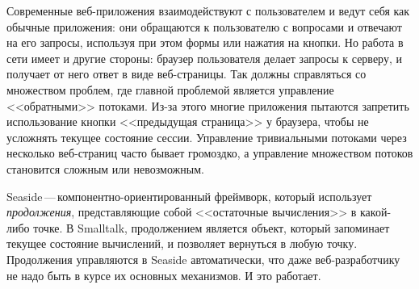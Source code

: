 \documentclass[a4paper,10pt,twoside]{book}
\begin{document}

Современные веб-приложения взаимодействуют с пользователем
и ведут себя как обычные приложения:
они обращаются к пользователю с вопросами и отвечают на его запросы,
используя при этом формы или нажатия на кнопки.
Но работа в сети имеет и другие стороны: браузер пользователя делает
запросы к серверу, и получает от него ответ в виде веб-страницы.
Так  должны справляться со множеством
проблем, где главной проблемой является управление
<<обратными>> потоками.
Из-за этого многие приложения пытаются запретить использование
кнопки <<предыдущая страница>> у браузера,
чтобы не усложнять текущее состояние сессии.
Управление тривиальными потоками через несколько веб-страниц
часто бывает громоздко,
а управление множеством потоков становится сложным или невозможным.


Seaside\,---\,компонентно-ориентированный фреймворк, который использует
\emph{продолжения}, представляющие собой <<остаточные вычисления>>
в какой-либо точке.
В Smalltalk, продолжением является объект,
который запоминает текущее состояние вычислений,
и позволяет вернуться в любую точку. Продолжения управляются в
Seaside автоматически, что даже веб-разработчику не надо быть в курсе
их основных механизмов. И это работает.
\end{document}
